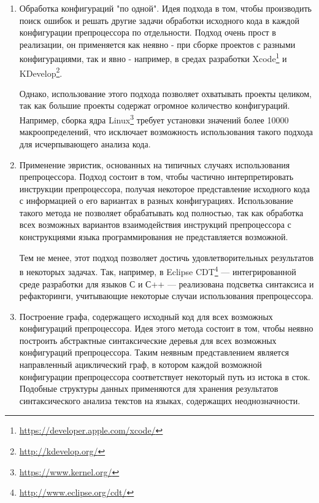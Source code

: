 \begin{enumerate}

\item 

Обработка конфигураций "по одной". Идея подхода в том, чтобы производить поиск ошибок и решать другие задачи обработки исходного кода в каждой конфигурации препроцессора по отдельности. Подход очень прост в реализации, он применяется как неявно - при сборке проектов с разными конфигурациями, так и явно - например, в средах разработки Xcode\footnote{\url{https://developer.apple.com/xcode/}} и KDevelop\footnote{\url{http://kdevelop.org/}}.

Однако, использование этого подхода позволяет охватывать проекты целиком, так как большие проекты содержат огромное количество конфигураций. Например, сборка ядра Linux\footnote{\url{https://www.kernel.org/}} требует установки значений более 10000 макроопределений\cite{typechef}, что исключает возможность использования такого подхода для исчерпывающего анализа кода.

\item

Применение эвристик, основанных на типичных случаях использования препроцессора. Подход состоит в том, чтобы частично интерпретировать инструкции препроцессора, получая некоторое представление исходного кода с информацией о его вариантах в разных конфигурациях. Использование такого метода не позволяет обрабатывать код полностью, так как обработка всех возможных вариантов взаимодействия инструкций препроцессора с конструкциями языка программирования не представляется возможной.

Тем не менее, этот подход позволяет достичь удовлетворительных результатов в некоторых задачах. Так, например, в Eclipse CDT\footnote{\url{http://www.eclipse.org/cdt/}} --- интегрированной среде разработки для языков С и С++ --- реализована подсветка синтаксиса и рефакторинги, учитывающие некоторые случаи использования препроцессора.

\item

Построение графа, содержащего исходный код для всех возможных конфигураций препроцессора. Идея этого метода состоит в том, чтобы неявно построить абстрактные синтаксические деревья для всех возможных конфигураций препроцессора. Таким неявным представлением является направленный ациклический граф, в котором каждой возможной конфигурации препроцессора соответствует некоторый путь из истока в сток. Подобные структуры данных применяются для хранения результатов синтаксического анализа текстов на языках, содержащих неоднозначности\cite{parseforests}.

\end{enumerate}

